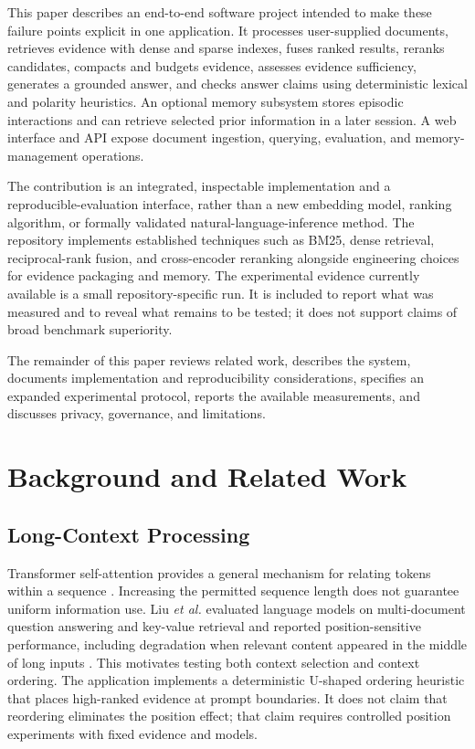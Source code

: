 \documentclass[conference]{IEEEtran}
\begin{document}
This paper describes an end-to-end software project intended to make these
failure points explicit in one application. It processes user-supplied
documents, retrieves evidence with dense and sparse indexes, fuses ranked
results, reranks candidates, compacts and budgets evidence, assesses evidence
sufficiency, generates a grounded answer, and checks answer claims using
deterministic lexical and polarity heuristics. An optional memory subsystem
stores episodic interactions and can retrieve selected prior information in a
later session. A web interface and API expose document ingestion, querying,
evaluation, and memory-management operations.

The contribution is an integrated, inspectable implementation and a
reproducible-evaluation interface, rather than a new embedding model, ranking
algorithm, or formally validated natural-language-inference method. The
repository implements established techniques such as BM25, dense retrieval,
reciprocal-rank fusion, and cross-encoder reranking alongside engineering
choices for evidence packaging and memory. The experimental evidence currently
available is a small repository-specific run. It is included to report what
was measured and to reveal what remains to be tested; it does not support
claims of broad benchmark superiority.

The remainder of this paper reviews related work, describes the system,
documents implementation and reproducibility considerations, specifies an
expanded experimental protocol, reports the available measurements, and
discusses privacy, governance, and limitations.

\section{Background and Related Work}

\subsection{Long-Context Processing}
Transformer self-attention provides a general mechanism for relating tokens
within a sequence \cite{vaswani2017attention}. Increasing the permitted sequence
length does not guarantee uniform information use. Liu \emph{et al.} evaluated
language models on multi-document question answering and key-value retrieval
and reported position-sensitive performance, including degradation when
relevant content appeared in the middle of long inputs \cite{liu2023lost}.
This motivates testing both context selection and context ordering. The
application implements a deterministic U-shaped ordering heuristic that places
high-ranked evidence at prompt boundaries. It does not claim that reordering
eliminates the position effect; that claim requires controlled position
experiments with fixed evidence and models.
\end{document}
